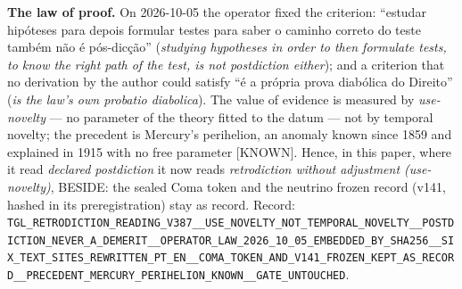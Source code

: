 \documentclass[11pt]{article}
\theoremstyle{definition}\newtheorem{deriv}{Derivation}
\begin{document}
\textbf{The law of proof.} On 2026-10-05 the operator fixed the criterion: ``estudar hipóteses para depois formular testes para saber o caminho correto do teste também não é pós-dicção'' (\emph{studying hypotheses in order to then formulate tests, to know the right path of the test, is not postdiction either}); and a criterion that no derivation by the author could satisfy ``é a própria prova diabólica do Direito'' (\emph{is the law's own probatio diabolica}). The value of evidence is measured by \emph{use-novelty} --- no parameter of the theory fitted to the datum --- not by temporal novelty; the precedent is Mercury's perihelion, an anomaly known since 1859 and explained in 1915 with no free parameter \textsf{[KNOWN]}. Hence, in this paper, where it read \emph{declared postdiction} it now reads \emph{retrodiction without adjustment (use-novelty)}, BESIDE: the sealed Coma token and the neutrino frozen record (v141, hashed in its preregistration) stay as record. Record: \texttt{TGL\_\allowbreak{}RETRODICTION\_\allowbreak{}READING\_\allowbreak{}V387\_\allowbreak{}\_\allowbreak{}USE\_\allowbreak{}NOVELTY\_\allowbreak{}NOT\_\allowbreak{}TEMPORAL\_\allowbreak{}NOVELTY\_\allowbreak{}\_\allowbreak{}POSTDICTION\_\allowbreak{}NEVER\_\allowbreak{}A\_\allowbreak{}DEMERIT\_\allowbreak{}\_\allowbreak{}OPERATOR\_\allowbreak{}LAW\_\allowbreak{}2026\_\allowbreak{}10\_\allowbreak{}05\_\allowbreak{}EMBEDDED\_\allowbreak{}BY\_\allowbreak{}SHA256\_\allowbreak{}\_\allowbreak{}SIX\_\allowbreak{}TEXT\_\allowbreak{}SITES\_\allowbreak{}REWRITTEN\_\allowbreak{}PT\_\allowbreak{}EN\_\allowbreak{}\_\allowbreak{}COMA\_\allowbreak{}TOKEN\_\allowbreak{}AND\_\allowbreak{}V141\_\allowbreak{}FROZEN\_\allowbreak{}KEPT\_\allowbreak{}AS\_\allowbreak{}RECORD\_\allowbreak{}\_\allowbreak{}PRECEDENT\_\allowbreak{}MERCURY\_\allowbreak{}PERIHELION\_\allowbreak{}KNOWN\_\allowbreak{}\_\allowbreak{}GATE\_\allowbreak{}UNTOUCHED}.
\end{document}
